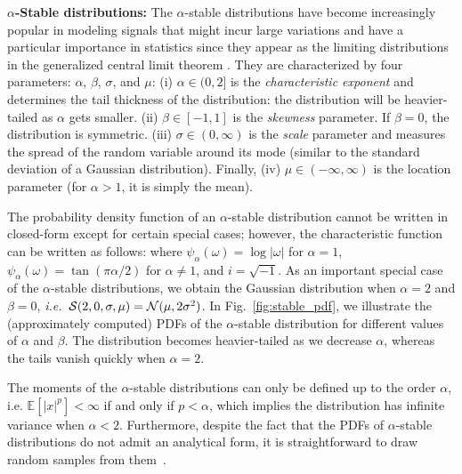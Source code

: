 \textbf{$\alpha$-Stable distributions:} 
The $\alpha$-stable distributions have become increasingly popular in modeling signals that might incur large variations \citep{kuruoglu1999signal, mandelbrot2013fractals,simsekli2015alpha,wang2016delving,leglaive:hal-01416366} and have a particular importance in statistics since they appear as the limiting distributions in the generalized central limit theorem \citep{samorodnitsky1994stable}. They are characterized by four parameters: $\alpha$, $\beta$, $\sigma$, and $\mu$:
%
(i) $\alpha \in (0,2]$ is the \emph{characteristic exponent} and determines the tail thickness of the distribution: the distribution will be heavier-tailed as $\alpha$ gets smaller. 
(ii) $\beta \in [-1 ,1]$ is the \emph{skewness} parameter.
If $\beta = 0$, the distribution is symmetric.
(iii) $\sigma \in (0,\infty)$ is the \emph{scale} parameter and measures the spread of the random variable around its mode (similar to the standard deviation of a Gaussian distribution). Finally, (iv) $\mu \in (-\infty, \infty)$ is the location parameter (for $\alpha > 1$, it is simply the mean). 

The probability density function of an $\alpha$-stable distribution cannot be written in closed-form except for certain special cases; however, the characteristic function  can be written as follows:
where $\psi_\alpha(\omega) = \log |\omega| $ for $\alpha =1$, $\psi_\alpha(\omega) = \tan(\pi \alpha/2)$ for $\alpha \neq 1$, and $i = \sqrt{-1}$. 
%
As an important special case of the $\alpha$-stable distributions, we obtain the Gaussian distribution when $\alpha = 2$ and $\beta =0$, \textit{i.e.}\ ${\cal S}(2,0,\sigma,\mu) = {\cal N}(\mu,2 \sigma^2)$. 
%
In Fig.~\ref{fig:stable_pdf}, we illustrate the (approximately computed) \acp{PDF} of the $\alpha$-stable distribution for different values of $\alpha$ and $\beta$. The distribution becomes heavier-tailed as we decrease $\alpha$, whereas the tails vanish quickly when $\alpha=2$. 


The moments of the $\alpha$-stable distributions can only be defined up to the order $\alpha$, i.e. $\mathds{E}[|x|^p] < \infty $ if and only if $p <\alpha$, which implies the distribution has infinite variance when $\alpha<2$. Furthermore, despite the fact that the \acp{PDF} of $\alpha$-stable distributions do not admit an analytical form, it is straightforward to draw random samples from them~\citep{chambers1976method}.





